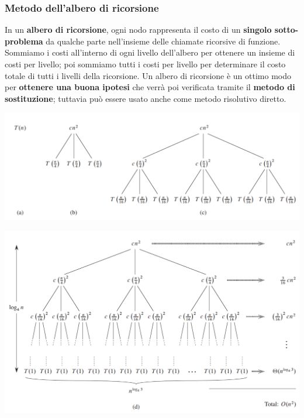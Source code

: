 \documentclass[12pt]{article}
\begin{document}
\subsubsection{Metodo dell'albero di ricorsione}
In un \textbf{albero di ricorsione}, ogni nodo rappresenta il costo di un \textbf{singolo sotto-problema} da qualche parte nell'insieme
delle chiamate ricorsive di funzione. Sommiamo i costi all'interno di ogni livello dell'albero per ottenere un insieme di costi per livello;
poi sommiamo tutti i costi per livello per determinare il costo totale di tutti i livelli della ricorsione.
Un albero di ricorsione è un ottimo modo per \textbf{ottenere una buona ipotesi} che verrà poi verificata tramite il \textbf{metodo di sostituzione}; tuttavia
può essere usato anche come metodo risolutivo diretto.
\begin{center}
    \includegraphics[width = 1\linewidth]{Images/2.png}
\end{center}
\begin{center}
    \includegraphics[width = 1\linewidth]{Images/3.png}
\end{center}
\end{document}
